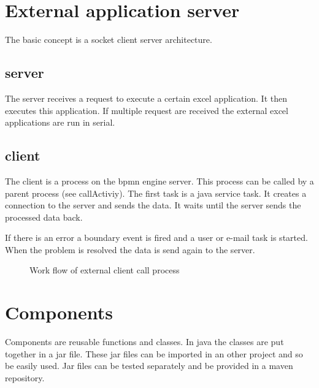 \documentclass[paper=a4,twoside=false,BCOR=0mm,DIV=calc,fontsize=12pt]{scrartcl}
\begin{document}
\section{External application server}

The basic concept is a socket client server architecture. 

\subsection{server}

The server receives a request to execute a certain excel application. It then executes this application. If multiple request are received the external excel applications are run in serial.





\subsection{client}

The client is a process on the bpmn engine server. This process can be called by a parent process (see callActiviy). 
The first task is a java service task. It creates a connection to the server and sends the data. 
It waits until the server sends the processed data back.

If there is an error a boundary event is fired and a user or e-mail task is started. When the problem is resolved the 
data is send again to the server.


\begin{figure}
    \begin{center}
    \end{center}
  \caption{Work flow of external client call process}
  \label{externClientWorkflow}
\end{figure} 



\section{Components}
Components are reusable functions and classes. In java the classes are put together in a jar file. These jar files can be imported in an other project and so be easily used.
Jar files can be tested separately and be provided in a maven repository.
\end{document}
